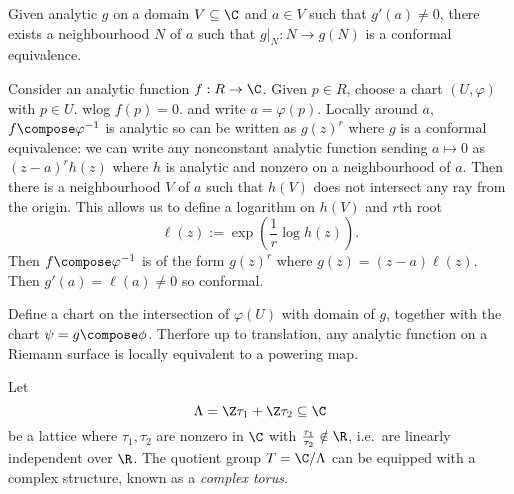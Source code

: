 \documentclass[a4paper]{article}
\begin{document}
\begin{theorem}
  Given analytic \(g\) on a domain \(V \subseteq \C\) and \(a \in V\) such that \(g'(a) \neq 0\), there exists a neighbourhood \(N\) of \(a\) such that \(g|_N : N \to g(N)\) is a conformal equivalence.
\end{theorem}

Consider an analytic function \(f: R \to \C\). Given \(p \in R\), choose a chart \((U, \varphi)\) with \(p \in U\). wlog \(f(p) = 0\). and write \(a = \varphi(p)\). Locally around \(a\), \(f \compose \varphi^{-1}\) is analytic so can be written as \(g(z)^r\) where \(g\) is a conformal equivalence: we can write any nonconstant analytic function sending \(a \mapsto 0\) as \((z - a)^r h(z)\) where \(h\) is analytic and nonzero on a neighbourhood of \(a\). Then there is a neighbourhood \(V\) of \(a\) such that \(h(V)\) does not intersect any ray from the origin. This allows us to define a logarithm on \(h(V)\) and \(r\)th root
\[
  \ell(z) := \exp( \frac{1}{r} \log h(z)).
\]
Then \(f \compose \varphi^{-1}\) is of the form \(g(z)^r\) where \(g(z) = (z - a)\ell(z)\). Then \(g'(a) = \ell(a) \neq 0\) so conformal.

Define a chart on the intersection of \(\varphi(U)\) with domain of \(g\), together with the chart \(\psi = g \compose \phi\). Therfore up to translation, any analytic function on a Riemann surface is locally equivalent to a powering map.

\begin{definition}
  Let
  \[
    \Lambda = \Z \tau_1 + \Z \tau_2 \subseteq \C
  \]
  be a lattice where \(\tau_1, \tau_2\) are nonzero in \(\C\) with \(\frac{\tau_1}{\tau_2} \notin \R\), i.e.\ are linearly independent over \(\R\). The quotient group \(T = \C / \Lambda\) can be equipped with a complex structure, known as a \emph{complex torus}.
\end{definition}
\end{document}
